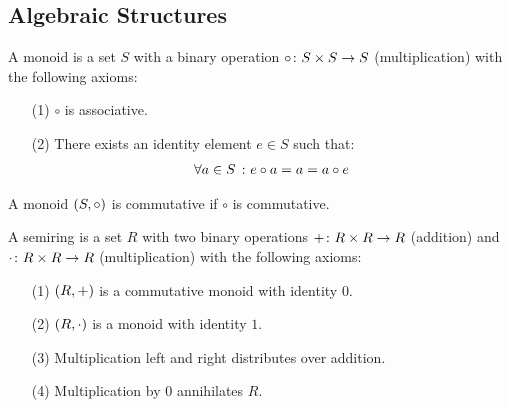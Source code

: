\subsection{Algebraic Structures}

\begin{definition}[Monoid]
  A monoid is a set \(S\) with a binary operation
  \(\circ \colon S \times S \to S\) (multiplication) with the following axioms:
  \begin{enumerate}
    \item[(1)]
      \(\circ\) is associative.

    \item[(2)]
      There exists an identity element \(e \in S\) such that:
      \begin{align*}
        \forall a \in S \ \colon e \circ a = a = a \circ e
      \end{align*}
  \end{enumerate}
\end{definition}

\begin{definition}
  A monoid \(\left(S, \circ\right)\) is commutative if \(\circ\) is commutative.
\end{definition}

\begin{definition}[Semiring]
  A semiring is a set \(R\) with two binary operations
  \(+ \colon R \times R \to R\) (addition) and
  \(\cdot \colon R \times R \to R\) (multiplication) with the following axioms:
  \begin{enumerate}
    \item[(1)]
      \(\left(R, +\right)\) is a commutative monoid with identity \(0\).

    \item[(2)]
      \(\left(R, \cdot\right)\) is a monoid with identity \(1\).

    \item[(3)]
      Multiplication left and right distributes over addition.

    \item[(4)]
      Multiplication by \(0\) annihilates \(R\).
  \end{enumerate}
\end{definition}


